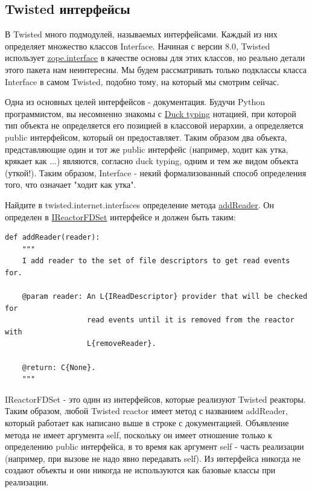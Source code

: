\subsection{Twisted интерфейсы}

В Twisted много подмодулей, называемых интерфейсами. Каждый из них 
определяет множество классов Interface. Начиная с версии 8.0, 
Twisted использует \href{http://www.zope.org/Products/ZopeInterface}{zope.interface} 
в качестве основы для этих классов, но реально детали этого пакета 
нам неинтересны. Мы будем рассматривать только подклассы класса 
Interface в самом Twisted, подобно тому, на который мы смотрим сейчас. 


Одна из основных целей интерфейсов - документация. Будучи 
Python программистом, вы несомненно знакомы с 
\href{http://en.wikipedia.org/wiki/Duck\_typing}{Duck typing} 
нотацией, при которой тип объекта не определяется его 
позицией в классовой иерархии, а определяется public 
интерфейсом, который он предоставляет. Таким образом два 
объекта, представляющие один и тот же public интерфейс (например, 
ходит как утка, крякает как ...) являются, согласно duck typing, 
одним и тем же видом объекта (уткой!). Таким образом, Interface - 
некий формализованный способ определения того, что означает 
"ходит как утка". 


Найдите в twisted.internet.interfaces определение метода 
\href{http://twistedmatrix.com/trac/browser/tags/releases/twisted-8.2.0/twisted/internet/interfaces.py#L810}{addReader}. 
Он определен в  
\href{http://twistedmatrix.com/trac/browser/tags/releases/twisted-8.2.0/twisted/internet/interfaces.py#L801}{IReactorFDSet} интерфейсе и должен быть таким:


\begin{scriptsize}\begin{verbatim}
def addReader(reader):
    """
    I add reader to the set of file descriptors to get read events for.

    @param reader: An L{IReadDescriptor} provider that will be checked for
                   read events until it is removed from the reactor with
                   L{removeReader}.

    @return: C{None}.
    """
\end{verbatim}\end{scriptsize}


IReactorFDSet - это один из интерфейсов, которые реализуют 
Twisted реакторы. Таким образом, любой Twisted reactor имеет 
метод с названием addReader, который работает как написано 
выше в строке с документацией. Объявление метода не имеет 
аргумента self, поскольку он имеет отношение только к определению 
public интерфейса, в то время как аргумент self - часть 
реализации (например, при вызове не надо явно передавать self). 
Из интерфейса никогда не создают объекты и они никогда не 
используются как базовые классы при  реализации.


